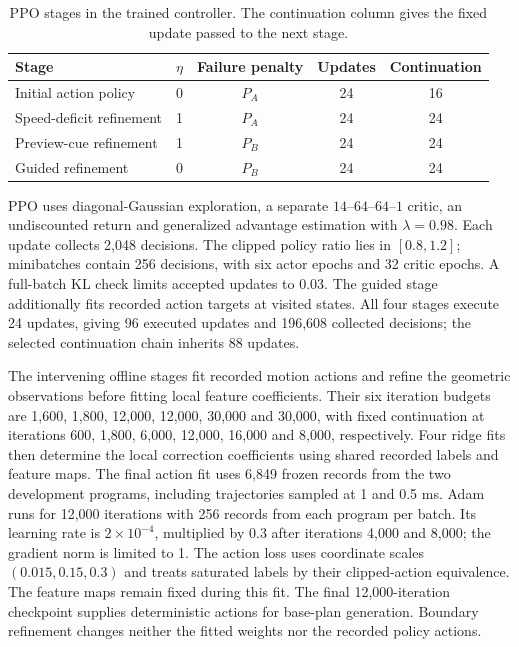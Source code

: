 \documentclass[preprint,12pt]{elsarticle}
\begin{document}
\begin{table}[tb]
\centering
\caption{PPO stages in the trained controller. The continuation column gives the fixed update passed to the next stage.}
\label{tab:frozen_ppo_stages}
\begin{tabular}{lcccc}
\hline
Stage & $\eta$ & Failure penalty & Updates & Continuation\\
\hline
Initial action policy & 0 & $P_A$ & 24 & 16\\
Speed-deficit refinement & 1 & $P_A$ & 24 & 24\\
Preview-cue refinement & 1 & $P_B$ & 24 & 24\\
Guided refinement & 0 & $P_B$ & 24 & 24\\
\hline
\end{tabular}
\end{table}

PPO uses diagonal-Gaussian exploration, a separate $14$--$64$--$64$--$1$ critic, an undiscounted return and generalized advantage estimation with $\lambda=0.98$. Each update collects 2,048 decisions. The clipped policy ratio lies in $[0.8,1.2]$; minibatches contain 256 decisions, with six actor epochs and 32 critic epochs. A full-batch KL check limits accepted updates to 0.03. The guided stage additionally fits recorded action targets at visited states. All four stages execute 24 updates, giving 96 executed updates and 196,608 collected decisions; the selected continuation chain inherits 88 updates.

The intervening offline stages fit recorded motion actions and refine the geometric observations before fitting local feature coefficients. Their six iteration budgets are 1,600, 1,800, 12,000, 12,000, 30,000 and 30,000, with fixed continuation at iterations 600, 1,800, 6,000, 12,000, 16,000 and 8,000, respectively. Four ridge fits then determine the local correction coefficients using shared recorded labels and feature maps. The final action fit uses 6,849 frozen records from the two development programs, including trajectories sampled at 1 and 0.5 ms. Adam runs for 12,000 iterations with 256 records from each program per batch. Its learning rate is $2\times10^{-4}$, multiplied by 0.3 after iterations 4,000 and 8,000; the gradient norm is limited to 1. The action loss uses coordinate scales $(0.015,0.15,0.3)$ and treats saturated labels by their clipped-action equivalence. The feature maps remain fixed during this fit. The final 12,000-iteration checkpoint supplies deterministic actions for base-plan generation. Boundary refinement changes neither the fitted weights nor the recorded policy actions.
\end{document}
